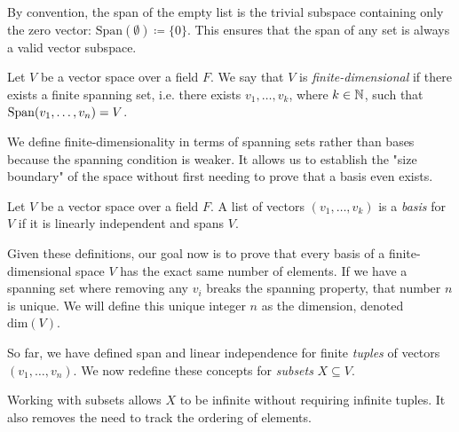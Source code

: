 \documentclass[../linear_algebra_and_groups.tex]{subfiles}
\begin{document}
\begin{remark}
    By convention, the span of the empty list is the trivial subspace containing only the zero vector: $\text{Span}(\emptyset) \coloneqq \{0\}$. This ensures that the span of any set is always a valid vector subspace.
\end{remark}

\begin{definition}
    \begin{shaded*}
        Let $V$ be a vector space over a field $F$. We say that $V$ is \textit{finite-dimensional} if there exists a finite spanning set, i.e. there exists $v_1,\dots,v_k$, where $k\in\mathbb{N}$, such that $\operatorname{Span}(v_1,\dots,v_n)=V$.
    \end{shaded*}
\end{definition}
\begin{remark}
    We define finite-dimensionality in terms of spanning sets rather than bases because the spanning condition is weaker. It allows us to establish the "size boundary" of the space without first needing to prove that a basis even exists.
\end{remark}

\begin{definition}[Basis]
    \begin{shaded*}
        Let $V$ be a vector space over a field $F$. A list of vectors $(v_1,\dots,v_k)$ is a \textit{basis} for $V$ if it is linearly independent and spans $V$.
    \end{shaded*}
\end{definition}

\begin{remark}
    Given these definitions, our goal now is to prove that every basis of a finite-dimensional space $V$ has the exact same number of elements. If we have a spanning set where removing any $v_i$ breaks the spanning property, that number $n$ is unique. We will define this unique integer $n$ as the dimension, denoted $\text{dim}(V)$.
\end{remark}

\begin{remark}
    So far, we have defined span and linear independence for finite \textit{tuples} of vectors $(v_1, \dots, v_n)$. We now redefine these concepts for \textit{subsets} $X \subseteq V$. 
    
    Working with subsets allows $X$ to be infinite without requiring infinite tuples. It also removes the need to track the ordering of elements. 
\end{remark}
\end{document}
